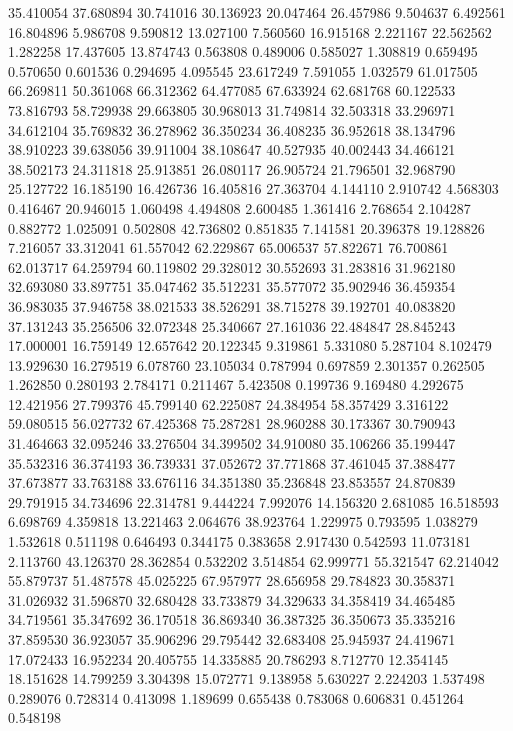 35.410054
37.680894
30.741016
30.136923
20.047464
26.457986
9.504637
6.492561
16.804896
5.986708
9.590812
13.027100
7.560560
16.915168
2.221167
22.562562
1.282258
17.437605
13.874743
0.563808
0.489006
0.585027
1.308819
0.659495
0.570650
0.601536
0.294695
4.095545
23.617249
7.591055
1.032579
61.017505
66.269811
50.361068
66.312362
64.477085
67.633924
62.681768
60.122533
73.816793
58.729938
29.663805
30.968013
31.749814
32.503318
33.296971
34.612104
35.769832
36.278962
36.350234
36.408235
36.952618
38.134796
38.910223
39.638056
39.911004
38.108647
40.527935
40.002443
34.466121
38.502173
24.311818
25.913851
26.080117
26.905724
21.796501
32.968790
25.127722
16.185190
16.426736
16.405816
27.363704
4.144110
2.910742
4.568303
0.416467
20.946015
1.060498
4.494808
2.600485
1.361416
2.768654
2.104287
0.882772
1.025091
0.502808
42.736802
0.851835
7.141581
20.396378
19.128826
7.216057
33.312041
61.557042
62.229867
65.006537
57.822671
76.700861
62.013717
64.259794
60.119802
29.328012
30.552693
31.283816
31.962180
32.693080
33.897751
35.047462
35.512231
35.577072
35.902946
36.459354
36.983035
37.946758
38.021533
38.526291
38.715278
39.192701
40.083820
37.131243
35.256506
32.072348
25.340667
27.161036
22.484847
28.845243
17.000001
16.759149
12.657642
20.122345
9.319861
5.331080
5.287104
8.102479
13.929630
16.279519
6.078760
23.105034
0.787994
0.697859
2.301357
0.262505
1.262850
0.280193
2.784171
0.211467
5.423508
0.199736
9.169480
4.292675
12.421956
27.799376
45.799140
62.225087
24.384954
58.357429
3.316122
59.080515
56.027732
67.425368
75.287281
28.960288
30.173367
30.790943
31.464663
32.095246
33.276504
34.399502
34.910080
35.106266
35.199447
35.532316
36.374193
36.739331
37.052672
37.771868
37.461045
37.388477
37.673877
33.763188
33.676116
34.351380
35.236848
23.853557
24.870839
29.791915
34.734696
22.314781
9.444224
7.992076
14.156320
2.681085
16.518593
6.698769
4.359818
13.221463
2.064676
38.923764
1.229975
0.793595
1.038279
1.532618
0.511198
0.646493
0.344175
0.383658
2.917430
0.542593
11.073181
2.113760
43.126370
28.362854
0.532202
3.514854
62.999771
55.321547
62.214042
55.879737
51.487578
45.025225
67.957977
28.656958
29.784823
30.358371
31.026932
31.596870
32.680428
33.733879
34.329633
34.358419
34.465485
34.719561
35.347692
36.170518
36.869340
36.387325
36.350673
35.335216
37.859530
36.923057
35.906296
29.795442
32.683408
25.945937
24.419671
17.072433
16.952234
20.405755
14.335885
20.786293
8.712770
12.354145
18.151628
14.799259
3.304398
15.072771
9.138958
5.630227
2.224203
1.537498
0.289076
0.728314
0.413098
1.189699
0.655438
0.783068
0.606831
0.451264
0.548198
